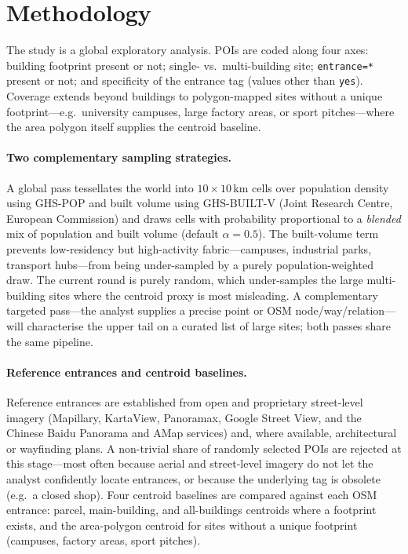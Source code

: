 \documentclass{article}
\begin{document}
\section{Methodology}

The study is a global exploratory analysis. POIs are coded
along four axes: building footprint
present or not; single- vs.\ multi-building site;
\texttt{entrance=*} present or not; and specificity of the
entrance tag (values other than \texttt{yes}). Coverage extends
beyond buildings to polygon-mapped sites without a unique
footprint---e.g.\ university campuses, large factory areas, or
sport pitches---where the area polygon itself supplies the
centroid baseline.

\paragraph{Two complementary sampling strategies.} A global pass
tessellates the world into $10\times10$\,km cells over population
density using GHS-POP and built volume using GHS-BUILT-V
(Joint Research Centre, European Commission) and draws cells with
probability proportional to a \emph{blended} mix of population
and built volume (default $\alpha=0.5$). The built-volume term
prevents low-residency but high-activity fabric---campuses,
industrial parks, transport hubs---from being under-sampled by a
purely population-weighted draw. The current round is purely
random, which under-samples the large multi-building sites where
the centroid proxy is most misleading. A complementary targeted
pass---the analyst supplies a precise point or OSM
node/way/relation---will characterise the upper tail on a curated
list of large sites; both passes share the same pipeline.

\paragraph{Reference entrances and centroid baselines.} Reference
entrances are established from open and proprietary street-level
imagery (Mapillary, KartaView, Panoramax, Google Street View,
and the Chinese Baidu Panorama and AMap services) and, where
available, architectural or wayfinding plans. A non-trivial share
of randomly selected POIs are rejected at this stage---most often
because aerial and street-level imagery do not let the analyst
confidently locate entrances, or because the underlying tag is
obsolete (e.g.\ a closed shop). Four centroid baselines are
compared against each OSM entrance: parcel, main-building, and
all-buildings centroids where a footprint exists, and the
area-polygon centroid for sites without a unique footprint
(campuses, factory areas, sport pitches).
\end{document}
